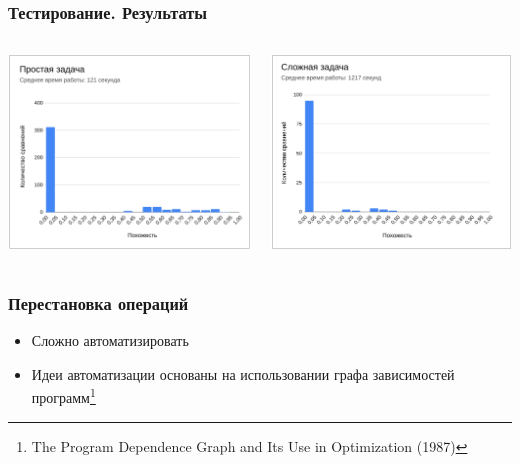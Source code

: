 \documentclass[10pt]{beamer}
\begin{document}
\begin{frame}\frametitle{Тестирование. Результаты}
	\begin{columns}
		\centering
		\includegraphics[scale=0.45]{res5.png}
		
		\centering
		\includegraphics[scale=0.45]{res6.png}
		
	\end{columns}
\end{frame}

\begin{frame}\frametitle{Перестановка операций}
	\begin{itemize}
		\item Сложно автоматизировать
		\item Идеи автоматизации основаны на использовании графа зависимостей программ\footnote[10,frame]{The Program Dependence Graph and Its Use in Optimization (1987)}
	\end{itemize}
\end{frame}
\end{document}
